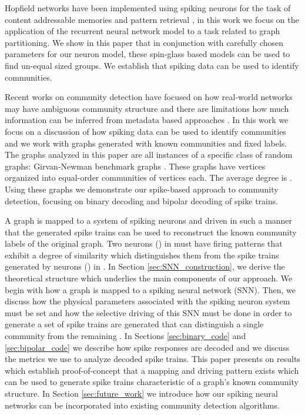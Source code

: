 \documentclass[sigconf]{acmart}
\begin{document}
Hopfield networks have been implemented using spiking neurons for the task of content addressable memories and pattern retrieval \cite{tanaka2005associative,maass1997networks}, in this work we focus on the application of the recurrent neural network model to a task related to graph partitioning. We show in this paper that in conjunction with carefully chosen parameters for our neuron model, these spin-glass based models can be used to find un-equal sized groups. We establish that spiking data can be used to identify  communities.

Recent works on community detection have focused on how real-world networks may have ambiguous community structure and there are limitations how much information can be inferred from metadata based approaches \cite{peel2017ground}. In this work we focus on a discussion of how spiking data can be used to identify communities and we work with graphs generated with known communities and fixed labels. The graphs analyzed in this paper are all instances of a specific class of random graphs: Girvan-Newman benchmark graphs \cite{girvan2002community}. These graphs have  vertices organized into  equal-order communities of  vertices each. The average degree is . Using these graphs we demonstrate our spike-based approach to community detection, focusing on binary decoding and bipolar decoding of spike trains. 

A graph is mapped to a system of spiking neurons and driven in such a manner that the generated spike trains can be used to reconstruct the known community labels of the original graph. Two neurons () in  must have firing patterns that exhibit a degree of similarity which distinguishes them from the spike trains generated by neurons () in . In Section \ref{sec:SNN_construction}, we derive the theoretical structure which underlies the main components of our approach. We begin with how a graph  is mapped to a spiking neural network (SNN). Then, we discuss how the physical parameters associated with the spiking neuron system must be set and how the selective driving of this SNN must be done in order to generate a set of spike trains are generated that can distinguish a single community  from the remaining .  In Sections \ref{sec:binary_code} and \ref{sec:bipolar_code} we describe how spike responses are decoded and we discuss the metrics we use to analyze decoded spike trains. This paper presents on results which establish proof-of-concept that a mapping and driving pattern exists which can be used to generate spike trains characteristic of a graph's known community structure. In Section \ref{sec:future_work} we introduce how our spiking neural networks can be incorporated into existing community detection algorithms.
\end{document}
